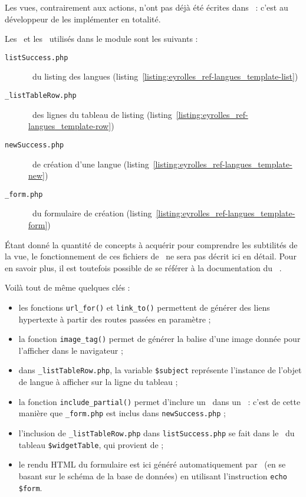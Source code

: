 Les vues, contrairement aux actions, n'ont pas déjà été écrites dans \asladmin\ : c'est au développeur de les implémenter en totalité.

Les \atemplates\ et les \apartials\ utilisés dans le module sont les suivants :

\begin{description}
	\item[\texttt{listSuccess.php}] \atemplate\ du listing des langues (listing~\ref{listing:eyrolles_ref-langues_template-list})
	\item[\texttt{\_listTableRow.php}] \apartial\ des lignes du tableau de listing (listing~\ref{listing:eyrolles_ref-langues_template-row})
	\item[\texttt{newSuccess.php}] \atemplate\ de création d'une langue (listing~\ref{listing:eyrolles_ref-langues_template-new})
	\item[\texttt{\_form.php}] \apartial\ du formulaire de création (listing~\ref{listing:eyrolles_ref-langues_template-form})
\end{description}

Étant donné la quantité de concepts à acquérir pour comprendre les subtilités de la vue, le fonctionnement de ces fichiers de \atemplate\ ne sera pas décrit ici en détail. Pour en savoir plus, il est toutefois possible de se référer à la documentation du \afm\ \asf\cite{thebook}.

Voilà tout de même quelques clés :

\begin{itemize}
	\item les fonctions \texttt{url\_for()} et \texttt{link\_to()} permettent de générer des liens hypertexte à partir des routes passées en paramètre ;
	\item la fonction \texttt{image\_tag()} permet de générer la balise d'une image donnée pour l'afficher dans le navigateur ;
	\item dans \texttt{\_listTableRow.php}, la variable \texttt{\$subject} représente l'instance de l'objet de langue à afficher sur la ligne du tableau ;
	\item la fonction \texttt{include\_partial()} permet d'inclure un \apartial\ dans un \atemplate\ : c'est de cette manière que \texttt{\_form.php} est inclus dans \texttt{new\-Success.php} ;
	\item l'inclusion de \texttt{\_listTableRow.php} dans \texttt{listSuccess.php} se fait dans le \awidget\ du tableau \texttt{\$widgetTable}, qui provient de \asladmin ;
	\item le rendu HTML du formulaire est ici généré automatiquement par \asf\ (en se basant sur le schéma de la base de données) en utilisant l'instruction \texttt{echo \$form}.
\end{itemize}
